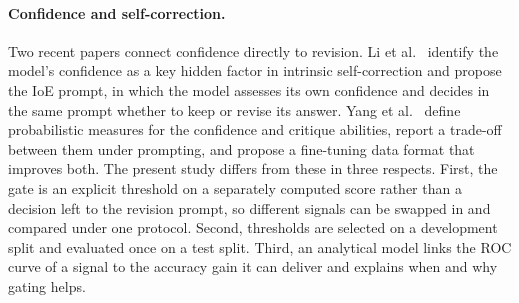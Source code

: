 \paragraph{Confidence and self-correction.}
Two recent papers connect confidence directly to revision. Li et al.~\cite{li2024confidence} identify the model's confidence as a key hidden factor in intrinsic self-correction and propose the IoE prompt, in which the model assesses its own confidence and decides in the same prompt whether to keep or revise its answer. Yang et al.~\cite{yang2024confidence} define probabilistic measures for the confidence and critique abilities, report a trade-off between them under prompting, and propose a fine-tuning data format that improves both. The present study differs from these in three respects. First, the gate is an explicit threshold on a separately computed score rather than a decision left to the revision prompt, so different signals can be swapped in and compared under one protocol. Second, thresholds are selected on a development split and evaluated once on a test split. Third, an analytical model links the ROC curve of a signal to the accuracy gain it can deliver and explains when and why gating helps.
